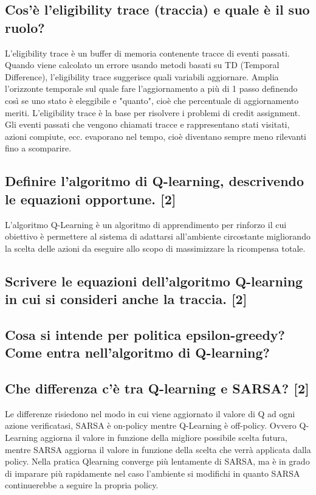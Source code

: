 \documentclass[\main/main.tex]{subfiles}
\begin{document}
\subsection{Cos'è l'eligibility trace (traccia) e quale è il suo ruolo?}
L'eligibility trace è un buffer di memoria contenente tracce di eventi passati.
Quando viene calcolato un errore usando metodi basati su TD (Temporal Difference), l'eligibility trace suggerisce quali variabili aggiornare.
Amplia l’orizzonte temporale sul quale fare l’aggiornamento a più di 1 passo definendo così se uno stato è eleggibile e "quanto", cioè che percentuale di aggiornamento meriti.
L'eligibility trace è la base per risolvere i problemi di credit assignment.
Gli eventi passati che vengono chiamati tracce e rappresentano stati visitati, azioni compiute, ecc. evaporano nel tempo, cioè diventano sempre meno rilevanti fino a scomparire.

\subsection{Definire l’algoritmo di Q-learning, descrivendo le equazioni opportune. [2]}
L'algoritmo Q-Learning è un algoritmo di apprendimento per rinforzo il cui obiettivo è permettere al sistema di adattarsi all'ambiente circostante migliorando la scelta delle azioni da eseguire allo scopo di massimizzare la ricompensa totale.
\subsection{Scrivere le equazioni dell'algoritmo Q-learning in cui si consideri anche la traccia. [2]}
\subsection{Cosa si intende per politica epsilon-greedy? Come entra nell’algoritmo di Q-learning? }
\subsection{Che differenza c'è tra Q-learning e SARSA? [2]}
Le differenze risiedono nel modo in cui viene aggiornato il valore di Q ad ogni azione verificatasi, SARSA è on-policy mentre Q-Learning è off-policy. Ovvero Q­Learning aggiorna il valore in funzione della migliore possibile scelta futura, mentre SARSA aggiorna il valore in funzione della scelta che verrà applicata dalla policy. Nella pratica Q­learning converge più lentamente di SARSA, ma è in grado di imparare più rapidamente nel caso l’ambiente si modifichi in quanto SARSA continuerebbe a seguire la propria policy.
\end{document}
